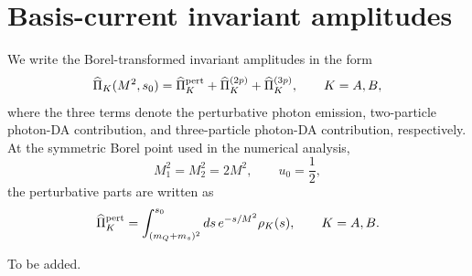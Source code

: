 \documentclass[aps,prd,preprint,nofootinbib,superscriptaddress]{revtex4-2}
\begin{document}
\section{Basis-current invariant amplitudes}
\label{app:basis-amplitudes}

We write the Borel-transformed invariant amplitudes in the form
\begin{equation}
  \widehat\Pi_K(M^2,s_0)
  =
  \widehat\Pi_K^{\rm pert}
  +\widehat\Pi_K^{(2p)}
  +\widehat\Pi_K^{(3p)},
  \qquad K=A,B ,
  \label{eq:app-pi-decomp}
\end{equation}
where the three terms denote the perturbative photon emission, two-particle
photon-DA contribution, and three-particle photon-DA contribution,
respectively.  At the symmetric Borel point used in the numerical analysis,
\[
  M_1^2=M_2^2=2M^2,\qquad u_0=\frac12 ,
\]
the perturbative parts are written as
\begin{equation}
  \widehat\Pi_K^{\rm pert}
  =
  \int_{(m_Q+m_s)^2}^{s_0}ds\,e^{-s/M^2}\rho_K(s),
  \qquad K=A,B .
  \label{eq:app-pert}
\end{equation}





\begin{acknowledgments}
To be added.
\end{acknowledgments}



\end{document}
